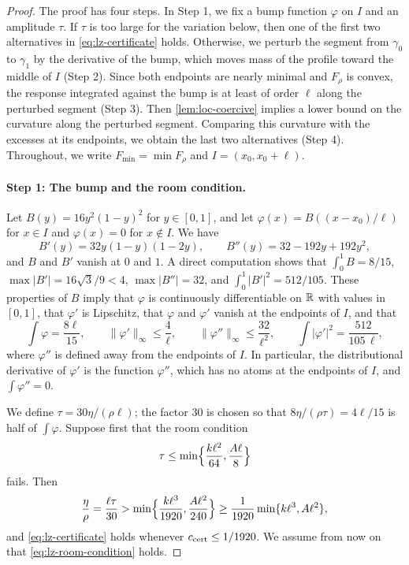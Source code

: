 \begin{proof}
The proof has four steps. In Step 1, we fix a bump function $\varphi$ on $I$
and an amplitude $\tau$. If $\tau$ is too large for the variation below, then
one of the first two alternatives in \eqref{eq:lz-certificate} holds. Otherwise, we perturb the segment from
$\gamma_0$ to $\gamma_1$ by the derivative of the bump, which moves mass of
the profile toward the middle of $I$ (Step 2). Since both endpoints are nearly
minimal and $F_\rho$ is convex, the response integrated against the bump is
at least of order $\ell$ along the perturbed segment (Step 3). Then
\cref{lem:loc-coercive} implies a lower bound on the curvature along the
perturbed segment. Comparing this curvature with the excesses at its
endpoints, we obtain the last two alternatives (Step 4). Throughout, we write $F_{\min}=\min F_\rho$ and
$I=(x_0,x_0+\ell)$.

\paragraph{Step 1: The bump and the room condition.}
Let $B(y)=16y^2(1-y)^2$ for $y\in[0,1]$, and let $\varphi(x)=B((x-x_0)/\ell)$
for $x\in I$ and $\varphi(x)=0$ for $x\notin I$. We have
\[
 B'(y)=32y(1-y)(1-2y),\qquad B''(y)=32-192y+192y^2,
\]
and $B$ and $B'$ vanish at $0$ and $1$. A direct computation shows that
$\int_0^1B=8/15$, $\max|B'|=16\sqrt3/9<4$, $\max|B''|=32$, and
$\int_0^1|B'|^2=512/105$. These properties of $B$ imply that $\varphi$ is
continuously differentiable on $\mathbb R$ with values in $[0,1]$, that $\varphi'$ is
Lipschitz, that $\varphi$ and $\varphi'$ vanish at the endpoints of $I$, and
that
\begin{equation}\label{eq:lz-bump}
 \int\varphi=\frac{8\ell}{15},\qquad \|\varphi'\|_\infty\le\frac4\ell,\qquad
 \|\varphi''\|_\infty\le\frac{32}{\ell^2},\qquad
 \int|\varphi'|^2=\frac{512}{105\,\ell},
\end{equation}
where $\varphi''$ is defined away from the endpoints of $I$. In particular,
the distributional derivative of $\varphi'$ is the function $\varphi''$, which
has no atoms at the endpoints of $I$, and $\int\varphi''=0$.

We define $\tau=30\eta/(\rho\ell)$; the factor $30$ is chosen so that
$8\eta/(\rho\tau)=4\ell/15$ is half of $\int\varphi$. Suppose first that the
room condition
\begin{equation}\label{eq:lz-room-condition}
 \tau\le\min\Bigl\{\frac{k\ell^2}{64},\frac{A\ell}8\Bigr\}
\end{equation}
fails. Then
\[
 \frac\eta\rho=\frac{\ell\tau}{30}
 >\min\Bigl\{\frac{k\ell^3}{1920},\frac{A\ell^2}{240}\Bigr\}
 \ge\frac1{1920}\min\{k\ell^3,A\ell^2\},
\]
and \eqref{eq:lz-certificate} holds whenever $c_{\rm cert}\le1/1920$. We
assume from now on that \eqref{eq:lz-room-condition} holds.


\end{proof}
